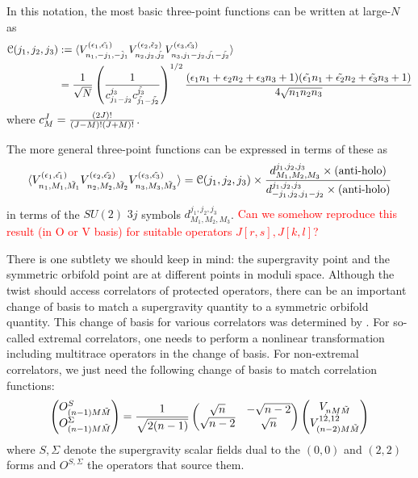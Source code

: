 \documentclass[11pt]{amsart}
\theoremstyle{thm}
\numberwithin{equation}{subsection}
\theoremstyle{def}
\theoremstyle{rem}
\begin{document}
In this notation, the most basic three-point functions can be written at large-$N$ as 
\begin{align*}
\mathcal{C}(j_1, j_2, j_3) &:= 
\langle V^{(\epsilon_1, \tilde{\epsilon_1})}_{n_1, -j_1, -\tilde{j}_1} V^{(\epsilon_2, \tilde{\epsilon}_2)}_{n_2, j_2, \tilde{j_2}} V^{(\epsilon_3, \tilde{\epsilon_3})}_{n_3, j_1 - j_2, \tilde{j_1} - \tilde{j_2}}\rangle  \\
&= {1 \over \sqrt{N}} \left({1 \over c^{j_3}_{j_1 - j_2} c^{\tilde{j_3}}_{\tilde{j_1} - \tilde{j_2}}} \right)^{1/2} {(\epsilon_1 n_1 + \epsilon_2 n_2 + \epsilon_3 n_3 + 1)(\tilde{\epsilon_1}n_1 + \tilde{\epsilon_2}n_2 + \tilde{\epsilon_3} n_3 + 1)   \over 4 \sqrt{n_1 n_2 n_3}} 
\end{align*}
where $c^J_M = {(2J)! \over (J - M)! (J+M)!}$. 

The more general three-point functions can be expressed in terms of these as 
\begin{equation}
\langle V^{(\epsilon_1, \tilde{\epsilon_1})}_{n_1, M_1, \tilde{M_1}} V^{(\epsilon_2 , \tilde{\epsilon_2})}_{n_2, M_2, \tilde{M_2}} V^{(\epsilon_3, \tilde{\epsilon_3})}_{n_3, M_3, \tilde{M_3}} \rangle = \mathcal{C}(j_1, j_2, j_3) \times {d^{j_1, j_2, j_3}_{M_1, M_2, M_3} \times (\textrm{anti-holo}) \over d^{j_1, j_2, j_3}_{-j_1, j_2, j_1 - j_2} \times (\textrm{anti-holo})}
\end{equation}
in terms of the $SU(2)$ $3j$ symbols $d^{j_1, j_2, j_3}_{M_1, M_2, M_3}$.
\textcolor{red}{Can we somehow reproduce this result (in O or V basis) for suitable operators $J[r,s], J[k, l]$?}

There is one subtlety we should keep in mind: the supergravity point and the symmetric orbifold point are at different points in moduli space. Although the twist should access correlators of protected operators, there can be an important change of basis to match a supergravity quantity to a symmetric orbifold quantity. This change of basis for various correlators was determined by \cite{Taylor}. For so-called extremal correlators, one needs to perform a nonlinear transformation including multitrace operators in the change of basis. For non-extremal correlators, we just need the following change of basis to match correlation functions:
\begin{equation}
\begin{pmatrix} O^S_{(n-1)M \tilde{M}} \\ O^{\Sigma}_{(n-1) M \tilde{M}} \end{pmatrix} = {1 \over \sqrt{2(n-1)}} \begin{pmatrix} \sqrt{n} & -\sqrt{n-2} \\ \sqrt{n-2} & \sqrt{ n}\end{pmatrix} \begin{pmatrix} V_{n M \tilde{M}} \\ V^{1\dot{2}, 1\dot{2}}_{(n-2) M \tilde{M}} \end{pmatrix}
\end{equation}
where $S, \Sigma$ denote the supergravity scalar fields dual to the $(0,0)$ and $(2, 2)$ forms and $O^{S, \Sigma}$ the operators that source them. 
\end{document}

